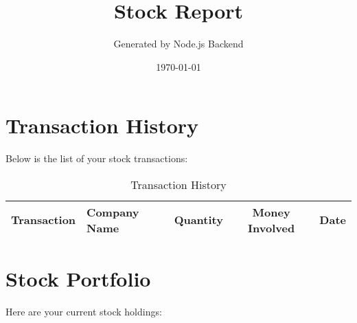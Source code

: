 \documentclass{article}
\begin{document}
\title{Stock Report}
\author{Generated by Node.js Backend}
\date{\today}
\maketitle

\section*{Transaction History}
Below is the list of your stock transactions:

\begin{table}[h]
    \centering
    \setlength{\arrayrulewidth}{1pt} %
    \setlength{\tabcolsep}{10pt} %
    
    \begin{tabular}{l l c c c}
        \rowcolor{black!40} %
        \textbf{Transaction} & \textbf{Company Name} & \textbf{Quantity} & \textbf{Money Involved} & \textbf{Date} \\
        \midrule
        \bottomrule
    \end{tabular}
    \caption{Transaction History}
    \label{tab:transactions}
\end{table}

\section*{Stock Portfolio}

Here are your current stock holdings:

\begin{itemize}
\end{itemize}
\end{document}
